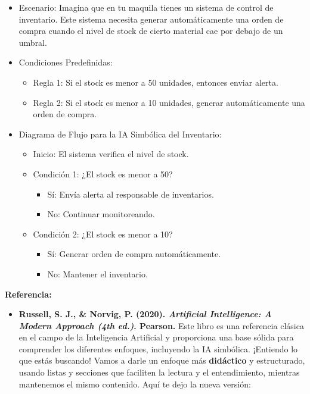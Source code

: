 \documentclass[
  10pt,
  letterpaper,
]{book}
\providecommand{\tightlist}{%
  \setlength{\itemsep}{0pt}\setlength{\parskip}{0pt}}\usepackage{longtable,booktabs,array}
\begin{document}
\begin{itemize}
\item
  Escenario: Imagina que en tu maquila tienes un sistema de control de
  inventario. Este sistema necesita generar automáticamente una orden de
  compra cuando el nivel de stock de cierto material cae por debajo de
  un umbral.
\item
  Condiciones Predefinidas:

  \begin{itemize}
  \tightlist
  \item
    Regla 1: Si el stock es menor a 50 unidades, entonces enviar alerta.
  \item
    Regla 2: Si el stock es menor a 10 unidades, generar automáticamente
    una orden de compra.
  \end{itemize}
\item
  Diagrama de Flujo para la IA Simbólica del Inventario:

  \begin{itemize}
  \tightlist
  \item
    Inicio: El sistema verifica el nivel de stock.
  \item
    Condición 1: ¿El stock es menor a 50?

    \begin{itemize}
    \tightlist
    \item
      Sí: Envía alerta al responsable de inventarios.
    \item
      No: Continuar monitoreando.
    \end{itemize}
  \item
    Condición 2: ¿El stock es menor a 10?

    \begin{itemize}
    \tightlist
    \item
      Sí: Generar orden de compra automáticamente.
    \item
      No: Mantener el inventario.
    \end{itemize}
  \end{itemize}
\end{itemize}

\textbf{Referencia:}

\begin{itemize}
\tightlist
\item
  \textbf{Russell, S. J., \& Norvig, P. (2020). \emph{Artificial
  Intelligence: A Modern Approach (4th ed.)}. Pearson.} Este libro es
  una referencia clásica en el campo de la Inteligencia Artificial y
  proporciona una base sólida para comprender los diferentes enfoques,
  incluyendo la IA simbólica. ¡Entiendo lo que estás buscando! Vamos a
  darle un enfoque más \textbf{didáctico} y estructurado, usando listas
  y secciones que faciliten la lectura y el entendimiento, mientras
  mantenemos el mismo contenido. Aquí te dejo la nueva versión:
\end{itemize}
\end{document}
